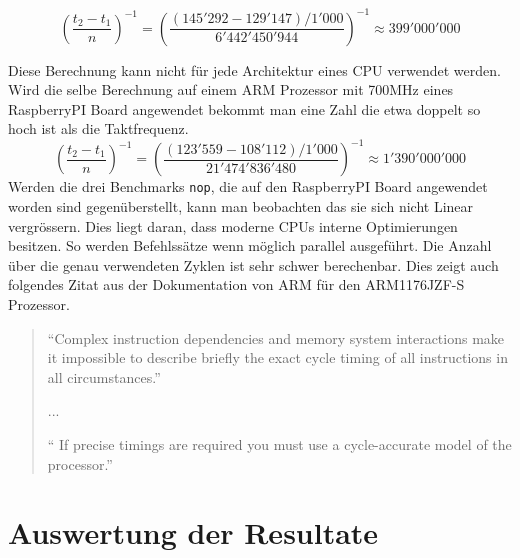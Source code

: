 \[ \left(\frac{t_2-t_1}{n}\right)^{-1} =  \left(\frac{(145'292-129'147)/1'000}{6'442'450'944}\right)^{-1} \approx 399'000'000 \]

Diese Berechnung kann nicht für jede Architektur eines CPU verwendet werden. Wird die selbe Berechnung auf einem ARM Prozessor mit 700MHz eines RaspberryPI Board angewendet bekommt man eine Zahl die etwa doppelt so hoch ist als die Taktfrequenz.
\[ \left(\frac{t_2-t_1}{n}\right)^{-1} =  \left(\frac{(123'559-108'112)/1'000}{21'474'836'480}\right)^{-1} \approx 1'390'000'000 \]
Werden die drei Benchmarks \texttt{nop}, die auf den RaspberryPI Board angewendet worden sind gegenüberstellt, kann man beobachten das sie sich nicht Linear vergrössern. Dies liegt daran, dass moderne CPUs interne Optimierungen besitzen. So werden Befehlssätze wenn möglich parallel ausgeführt. Die Anzahl über die genau verwendeten Zyklen ist sehr schwer berechenbar. Dies zeigt auch folgendes Zitat aus der Dokumentation von ARM für den ARM1176JZF-S Prozessor.

\begin{quotation}
\enquote{Complex instruction dependencies and memory system interactions make it impossible to
describe briefly the exact cycle timing of all instructions in all circumstances.}
\par
...
\par
\enquote{ If precise timings are required you must use a cycle-accurate model of the processor.\cite{arm_datasheet}}
\end{quotation}



\section{Auswertung der Resultate}
























